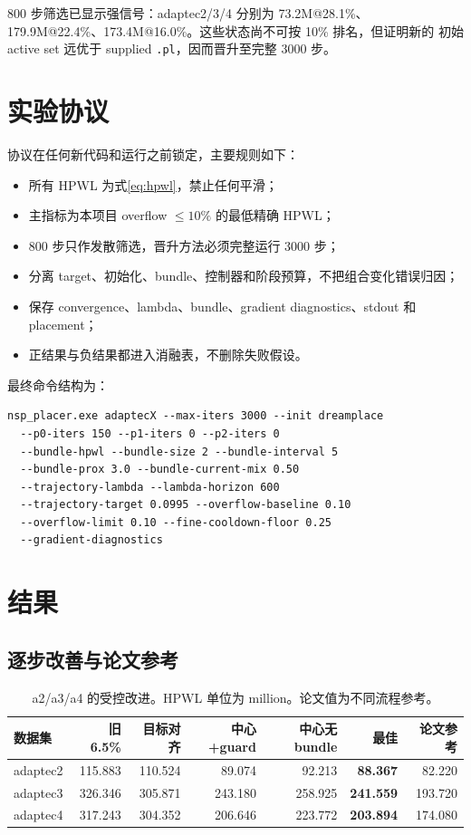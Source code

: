 \documentclass[UTF8,fontset=windows,a4paper,11pt]{ctexart}
\newcommand{\code}[1]{\texttt{#1}}
\begin{document}
800 步筛选已显示强信号：adaptec2/3/4 分别为 73.2M@28.1\%、
179.9M@22.4\%、173.4M@16.0\%。这些状态尚不可按 10\% 排名，但证明新的
初始 active set 远优于 supplied \code{.pl}，因而晋升至完整 3000 步。

\section{实验协议}

协议在任何新代码和运行之前锁定，主要规则如下：
\begin{itemize}
  \item 所有 HPWL 为式\eqref{eq:hpwl}，禁止任何平滑；
  \item 主指标为本项目 overflow $\leq10\%$ 的最低精确 HPWL；
  \item 800 步只作发散筛选，晋升方法必须完整运行 3000 步；
  \item 分离 target、初始化、bundle、控制器和阶段预算，不把组合变化错误归因；
  \item 保存 convergence、lambda、bundle、gradient diagnostics、stdout 和 placement；
  \item 正结果与负结果都进入消融表，不删除失败假设。
\end{itemize}

最终命令结构为：
\begin{verbatim}
nsp_placer.exe adaptecX --max-iters 3000 --init dreamplace
  --p0-iters 150 --p1-iters 0 --p2-iters 0
  --bundle-hpwl --bundle-size 2 --bundle-interval 5
  --bundle-prox 3.0 --bundle-current-mix 0.50
  --trajectory-lambda --lambda-horizon 600
  --trajectory-target 0.0995 --overflow-baseline 0.10
  --overflow-limit 0.10 --fine-cooldown-floor 0.25
  --gradient-diagnostics
\end{verbatim}

\section{结果}

\subsection{逐步改善与论文参考}

\begin{table}[H]
\centering
\small
\caption{a2/a3/a4 的受控改进。HPWL 单位为 million。论文值为不同流程参考。}
\begin{tabular}{lrrrrrr}
\toprule
数据集 & 旧 6.5\% & 目标对齐 & 中心+guard & 中心无 bundle & 最佳 & 论文参考\\
\midrule
adaptec2 & 115.883 & 110.524 & 89.074 & 92.213 & \textbf{88.367} & 82.220\\
adaptec3 & 326.346 & 305.871 & 243.180 & 258.925 & \textbf{241.559} & 193.720\\
adaptec4 & 317.243 & 304.352 & 206.646 & 223.772 & \textbf{203.894} & 174.080\\
\bottomrule
\end{tabular}
\end{table}
\end{document}
